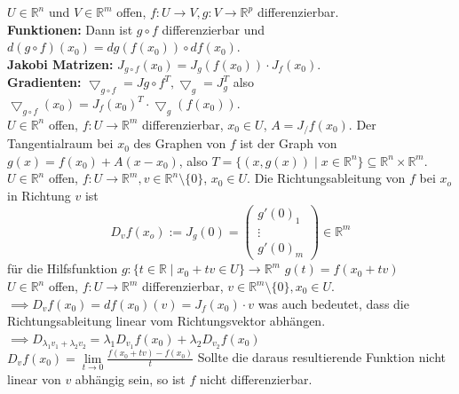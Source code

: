 \(U\in\mathbb R^n\) und \(V\in\mathbb R^m\) offen, \(f:U\rightarrow V, g:V\rightarrow\mathbb R^p\) differenzierbar.\\
\textbf{Funktionen:} 
Dann ist $g\circ f$ differenzierbar und $d(g\circ f)(x_0)=dg(f(x_0))\circ df(x_0)$.\\
\textbf{Jakobi Matrizen:}
\(J_{g\circ f}(x_0)=J_g(f(x_0))\cdot J_f(x_0)\).\\
\textbf{Gradienten:}
\(\bigtriangledown_{g\circ f}=J{g\circ f}^T, \bigtriangledown_g=J_g^T\) also
\(\bigtriangledown_{g\circ f}(x_0)=J_f(x_0)^T\cdot\bigtriangledown_g(f(x_0))\).\\
  \(U\in\mathbb{R}^n\) offen, \(f: U\rightarrow\mathbb{R}^m\) differenzierbar, \(x_0\in U\), \(A=J_/f(x_0)\). Der Tangentialraum bei \(x_0\) des Graphen von \(f\) ist der Graph von \(g(x)=f(x_0)+A(x-x_0)\), also \(T=\{(x,g(x))\mid x\in\mathbb{R}^n\}\subseteq\mathbb{R}^n\times\mathbb{R}^m\).\\
  \(U\in\mathbb{R}^n\) offen, \(f:U\rightarrow \mathbb{R}^m, v\in\mathbb{R}^n\setminus\{0\}\), \(x_0\in U\). Die Richtungsableitung von \(f\) bei \(x_o\) in Richtung \(v\) ist \[D_v f(x_o) := J_g(0)=\begin{pmatrix}g'(0)_1\\\vdots\\g'(0)_m\end{pmatrix}\in\mathbb R^m\] für die Hilfsfunktion \(g : \{t\in\mathbb R\mid x_0 + tv\in U\}\rightarrow \mathbb R ^m\) \(g(t)=f(x_0+tv)\)\\
  \(U\in\mathbb R^n\) offen, \(f:U\rightarrow\mathbb R^m\) differenzierbar, \(v\in\mathbb R^m\setminus\{0\}, x_0\in U\). \\\(\implies D_vf(x_0)=df(x_0)(v)=J_f(x_0)\cdot v\) was auch bedeutet, dass die Richtungsableitung linear vom Richtungsvektor abhängen.\\
  \(\implies D_{\lambda_1v_1+\lambda_2v_2}=\lambda_1D_{v_1}f(x_0)+\lambda_2D_{v_2}f(x_0)\)\\
  \(D_vf(x_0)=\lim\limits_{t\rightarrow0}\frac{f(x_0+tv)-f(x_0)}{t}\) Sollte die
  daraus resultierende Funktion nicht linear von \(v\) abhängig sein, so ist
  \(f\) nicht differenzierbar.
